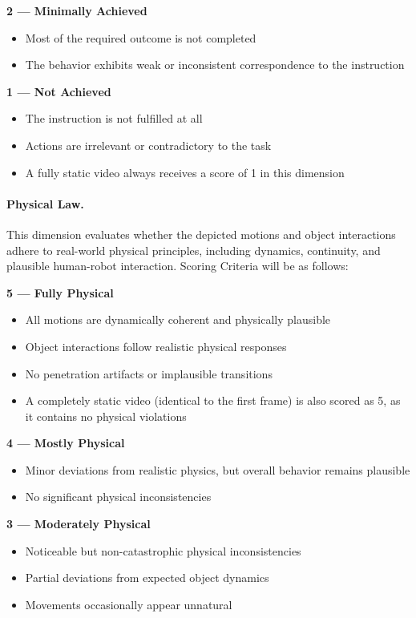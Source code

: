 \textbf{2 — Minimally Achieved}\par
\begin{itemize}
    \item Most of the required outcome is not completed
    \item The behavior exhibits weak or inconsistent correspondence to the instruction
\end{itemize}

\textbf{1 — Not Achieved}\par
\begin{itemize}
    \item The instruction is not fulfilled at all
    \item Actions are irrelevant or contradictory to the task
    \item A fully static video always receives a score of 1 in this dimension
\end{itemize}

\paragraph{Physical Law.} This dimension evaluates whether the depicted motions and object interactions adhere to real-world physical principles, including dynamics, continuity, and plausible human-robot interaction.
Scoring Criteria will be as follows:

\textbf{5 — Fully Physical}\par
\begin{itemize}
    \item All motions are dynamically coherent and physically plausible
    \item Object interactions follow realistic physical responses
    \item No penetration artifacts or implausible transitions
    \item A completely static video (identical to the first frame) is also scored as 5, as it contains no physical violations
\end{itemize}

\textbf{4 — Mostly Physical}\par
\begin{itemize}
    \item Minor deviations from realistic physics, but overall behavior remains plausible
    \item No significant physical inconsistencies
\end{itemize}
 
\textbf{3 — Moderately Physical}\par
\begin{itemize}
    \item Noticeable but non-catastrophic physical inconsistencies
    \item Partial deviations from expected object dynamics
    \item Movements occasionally appear unnatural
\end{itemize}

